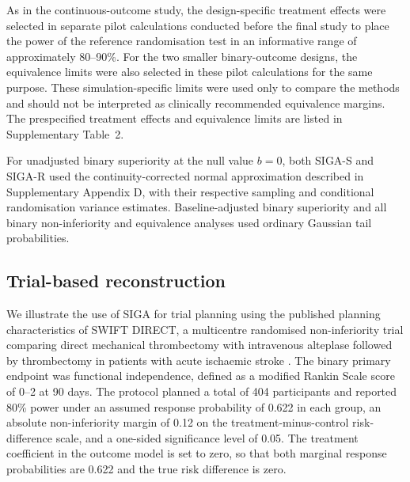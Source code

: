\documentclass[12pt,a4paper]{article}
\theoremstyle{definition}
\theoremstyle{remark}\newtheorem{remark}{Remark}
\numberwithin{equation}{section}
\begin{document}
As in the continuous-outcome study, the design-specific treatment effects were selected in separate pilot calculations conducted before the final study to place the power of the reference randomisation test in an informative range of approximately 80--90\%. For the two smaller binary-outcome designs, the equivalence limits were also selected in these pilot calculations for the same purpose. These simulation-specific limits were used only to compare the methods and should not be interpreted as clinically recommended equivalence margins. The prespecified treatment effects and equivalence limits are listed in Supplementary Table~2.

For unadjusted binary superiority at the null value $b=0$, both SIGA-S and SIGA-R used the continuity-corrected normal approximation described in Supplementary Appendix D, with their respective sampling and conditional randomisation variance estimates. Baseline-adjusted binary superiority and all binary non-inferiority and equivalence analyses used ordinary Gaussian tail probabilities.


\subsection{Trial-based reconstruction}\label{sec:supp-trial-model}
We illustrate the use of SIGA for trial planning using the published planning characteristics of SWIFT DIRECT, a multicentre randomised non-inferiority trial comparing direct mechanical thrombectomy with intravenous alteplase followed by thrombectomy in patients with acute ischaemic stroke \citep{FischerEtAl2022Protocol,FischerEtAl2022Trial}. The binary primary endpoint was functional independence, defined as a modified Rankin Scale score of 0--2 at 90 days. The protocol planned a total of 404 participants and reported 80\% power under an assumed response probability of 0.622 in each group, an absolute non-inferiority margin of 0.12 on the treatment-minus-control risk-difference scale, and a one-sided significance level of 0.05. The treatment coefficient in the outcome model is set to zero, so that both marginal response probabilities are 0.622 and the true risk difference is zero.
\end{document}

